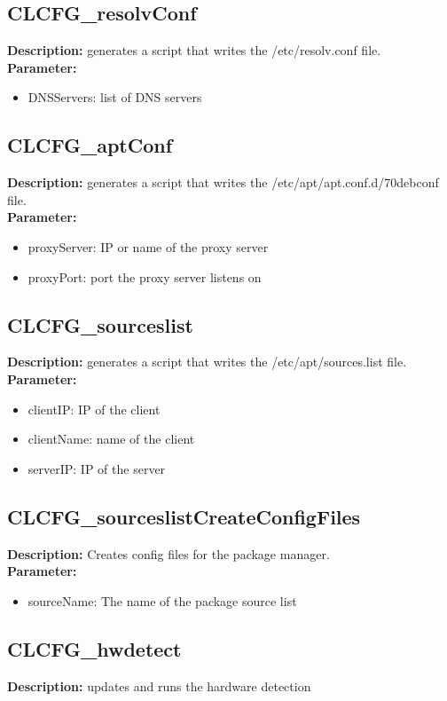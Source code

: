 \subsection{CLCFG\_resolvConf}
\textbf{Description:} generates a script that writes the /etc/resolv.conf file.\\
\textbf{Parameter:}
\begin{itemize}
\item DNSServers: list of DNS servers
\end{itemize}

\subsection{CLCFG\_aptConf}
\textbf{Description:} generates a script that writes the /etc/apt/apt.conf.d/70debconf file.\\
\textbf{Parameter:}
\begin{itemize}
\item proxyServer: IP or name of the proxy server
\item proxyPort: port the proxy server listens on
\end{itemize}

\subsection{CLCFG\_sourceslist}
\textbf{Description:} generates a script that writes the /etc/apt/sources.list file.\\
\textbf{Parameter:}
\begin{itemize}
\item clientIP: IP of the client
\item clientName: name of the client
\item serverIP: IP of the server
\end{itemize}

\subsection{CLCFG\_sourceslistCreateConfigFiles}
\textbf{Description:} Creates config files for the package manager.\\
\textbf{Parameter:}
\begin{itemize}
\item sourceName: The name of the package source list
\end{itemize}

\subsection{CLCFG\_hwdetect}
\textbf{Description:} updates and runs the hardware detection\\

